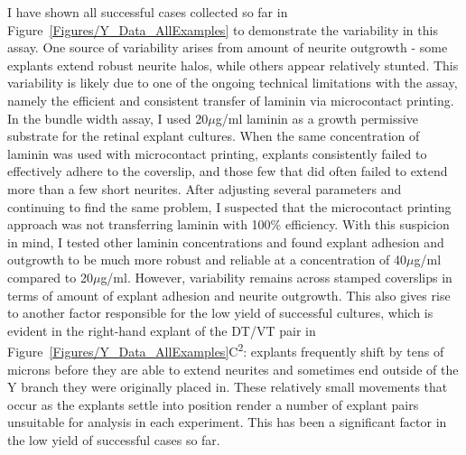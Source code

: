 I have shown all successful cases collected so far in Figure~\ref{Figures/Y_Data_AllExamples} to demonstrate the variability in this assay.
One source of variability arises from amount of neurite outgrowth - some explants extend robust neurite halos, while others appear relatively stunted.
This variability is likely due to one of the ongoing technical limitations with the assay, namely the efficient and consistent transfer of laminin via microcontact printing.
In the bundle width assay, I used 20$\mu$g/ml laminin as a growth permissive substrate for the retinal explant cultures.
When the same concentration of laminin was used with microcontact printing, explants consistently failed to effectively adhere to the coverslip, and those few that did often failed to extend more than a few short neurites.
After adjusting several parameters and continuing to find the same problem, I suspected that the microcontact printing approach was not transferring laminin with 100\% efficiency.
With this suspicion in mind, I tested other laminin concentrations and found explant adhesion and outgrowth to be much more robust and reliable at a concentration of 40$\mu$g/ml compared to 20$\mu$g/ml.
However, variability remains across stamped coverslips in terms of amount of explant adhesion and neurite outgrowth.
This also gives rise to another factor responsible for the low yield of successful cultures, which is evident in the right-hand explant of the DT/VT pair in Figure~\ref{Figures/Y_Data_AllExamples}C\textsuperscript{2}: explants frequently shift by tens of microns before they are able to extend neurites and sometimes end outside of the Y branch they were originally placed in.
These relatively small movements that occur as the explants settle into position render a number of explant pairs unsuitable for analysis in each experiment.
This has been a significant factor in the low yield of successful cases so far.

